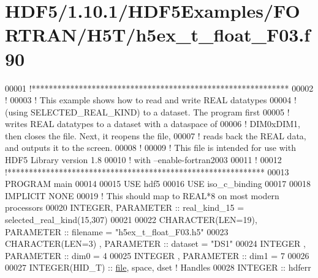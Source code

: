 \hypertarget{_h_d_f5_21_810_81_2_h_d_f5_examples_2_f_o_r_t_r_a_n_2_h5_t_2h5ex__t__float___f03_8f90_source}{}\section{H\+D\+F5/1.10.1/\+H\+D\+F5\+Examples/\+F\+O\+R\+T\+R\+A\+N/\+H5\+T/h5ex\+\_\+t\+\_\+float\+\_\+\+F03.f90}
\label{_h_d_f5_21_810_81_2_h_d_f5_examples_2_f_o_r_t_r_a_n_2_h5_t_2h5ex__t__float___f03_8f90_source}

\begin{DoxyCode}
00001 \textcolor{comment}{!************************************************************}
00002 \textcolor{comment}{!}
00003 \textcolor{comment}{!  This example shows how to read and write REAL datatypes}
00004 \textcolor{comment}{!  (using SELECTED\_REAL\_KIND) to a dataset.  The program first }
00005 \textcolor{comment}{!  writes REAL datatypes to a dataset with a dataspace of }
00006 \textcolor{comment}{!  DIM0xDIM1, then closes the file.  Next, it reopens the file, }
00007 \textcolor{comment}{!  reads back the REAL data, and outputs it to the screen.}
00008 \textcolor{comment}{!}
00009 \textcolor{comment}{!  This file is intended for use with HDF5 Library version 1.8}
00010 \textcolor{comment}{!  with --enable-fortran2003}
00011 \textcolor{comment}{!}
00012 \textcolor{comment}{!************************************************************}
00013 \textcolor{keyword}{PROGRAM} main
00014 
00015   \textcolor{keywordtype}{USE }hdf5
00016   \textcolor{keywordtype}{USE }iso\_c\_binding
00017 
00018   \textcolor{keywordtype}{IMPLICIT NONE}
00019   \textcolor{comment}{! This should map to REAL*8 on most modern processors}
00020   \textcolor{keywordtype}{INTEGER}, \textcolor{keywordtype}{PARAMETER} :: real\_kind\_15 = selected\_real\_kind(15,307)
00021 
00022   \textcolor{keywordtype}{CHARACTER(LEN=19)}, \textcolor{keywordtype}{PARAMETER} :: filename  = \textcolor{stringliteral}{"h5ex\_t\_float\_F03.h5"}
00023   \textcolor{keywordtype}{CHARACTER(LEN=3)} , \textcolor{keywordtype}{PARAMETER} :: dataset   = \textcolor{stringliteral}{"DS1"}
00024   \textcolor{keywordtype}{INTEGER}          , \textcolor{keywordtype}{PARAMETER} :: dim0      = 4
00025   \textcolor{keywordtype}{INTEGER}          , \textcolor{keywordtype}{PARAMETER} :: dim1      = 7
00026 
00027   \textcolor{keywordtype}{INTEGER(HID\_T)}  :: \hyperlink{structfile}{file}, space, dset \textcolor{comment}{! Handles}
00028   \textcolor{keywordtype}{INTEGER} :: hdferr

\end{DoxyCode}
